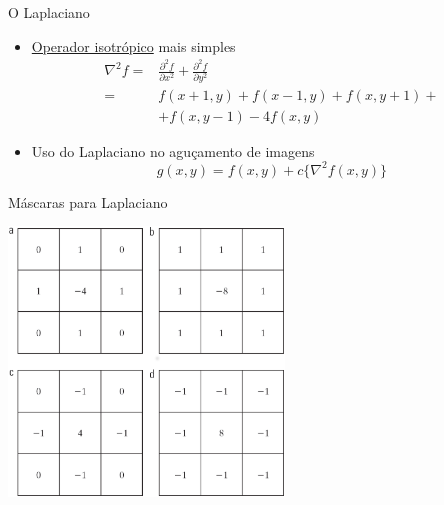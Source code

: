       \begin{slide}[toc=]{O Laplaciano}
      \begin{itemize}
         \item \underline{Operador isotrópico} mais simples
         \begin{align*}
            \nabla^2f =& \frac{\partial^2f}{\partial x^2}+\frac{\partial^2f}{\partial y^2}\\
                      =& f(x+1,y)+f(x-1,y)+f(x,y+1)+\\
                       & + f(x,y-1)-4f(x,y)
         \end{align*}
         \item Uso do Laplaciano no aguçamento de imagens
         \begin{equation*}
            g(x,y) = f(x,y) + c\{\nabla^2f(x,y)\}
         \end{equation*}
      \end{itemize}
      \end{slide}
      
      \begin{slide}[toc=]{Máscaras para Laplaciano}
      \begin{center}
          \includegraphics[width=0.55\textwidth]{figs/fig0337}
      \end{center}  
      \end{slide}
      
